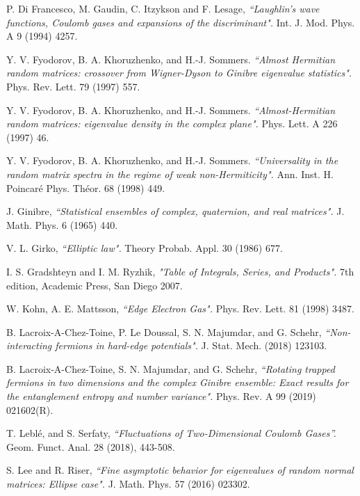 \documentclass[%
 jmp,
cp,  %
 amsmath,amsthm,amssymb,%
 reprint,%
onecolumn]{revtex4-2}
\begin{document}
\begin{thebibliography}{1}
P. Di Francesco, M. Gaudin, C. Itzykson and F. Lesage, \emph{``Laughlin’s wave functions, Coulomb gases and expansions of the discriminant".} Int. J. Mod. Phys. A 9 (1994) 4257.%




 Y. V. Fyodorov, B. A. Khoruzhenko, and H.-J. Sommers. \emph{``Almost Hermitian random matrices: crossover from Wigner-Dyson to Ginibre eigenvalue statistics".}
Phys. Rev. Lett. 79 %
(1997) 557.

 Y. V. Fyodorov, B. A. Khoruzhenko, and H.-J. Sommers. 
\emph{``Almost-Hermitian random matrices: eigenvalue density in the complex plane".} 
Phys. Lett. A 226 
(1997) 46.%

Y. V. Fyodorov, B. A. Khoruzhenko, and H.-J. Sommers. 
\emph{``Universality in the random matrix spectra in the regime of weak non-Hermiticity".}
 Ann. Inst. H. Poincaré Phys. Théor. 68 %
 (1998) 449.%
 


J. Ginibre, \emph{``Statistical ensembles of complex, quaternion, and real matrices".} J. Math. Phys. 6 (1965) 440.%

 
 
V. L. Girko, \emph{``Elliptic law".} Theory Probab. Appl. 30
(1986) 
677.%


I. S. Gradshteyn and I. M. Ryzhik, \emph{"Table of Integrals, Series, and Products".} 
7th edition, Academic Press, San Diego 2007.


W. Kohn, A. E. Mattsson, \emph{``Edge Electron Gas".} Phys. Rev. Lett. 81 (1998) 3487.


B. Lacroix-A-Chez-Toine, P. Le Doussal, S. N. Majumdar, and G. Schehr, \emph{``Non-interacting fermions in hard-edge potentials".} 
J. Stat. Mech. (2018) 123103.

 B. Lacroix-A-Chez-Toine, S. N. Majumdar, and G. Schehr, 
\emph{``Rotating trapped fermions in two dimensions and the complex Ginibre ensemble: Exact results for the entanglement entropy and number variance".}
Phys. Rev. A 99 (2019)  021602(R).%

 T. Lebl\'e, and S. Serfaty,
\emph{``Fluctuations of Two-Dimensional Coulomb Gases''.}
Geom. Funct. Anal. 28 (2018), 443-508.

 S. Lee and R. Riser, 
\emph{``Fine asymptotic behavior for
eigenvalues of random normal
matrices: Ellipse case".}
J. Math. Phys. 57  (2016) 023302.


\end{thebibliography}
\end{document}

